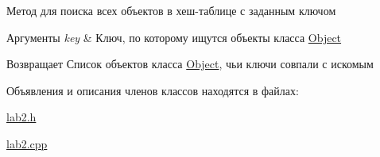 Метод для поиска всех объектов в хеш-\/таблице с заданным ключом 


\begin{DoxyParams}{Аргументы}
{\em key} & Ключ, по которому ищутся объекты класса \mbox{\hyperlink{structObject}{Object}} \\
\hline
\end{DoxyParams}
\begin{DoxyReturn}{Возвращает}
Список объектов класса \mbox{\hyperlink{structObject}{Object}}, чьи ключи совпали с искомым 
\end{DoxyReturn}


Объявления и описания членов классов находятся в файлах\+:\begin{DoxyCompactItemize}
\item 
\mbox{\hyperlink{lab2_8h}{lab2.\+h}}\item 
\mbox{\hyperlink{lab2_8cpp}{lab2.\+cpp}}\end{DoxyCompactItemize}
